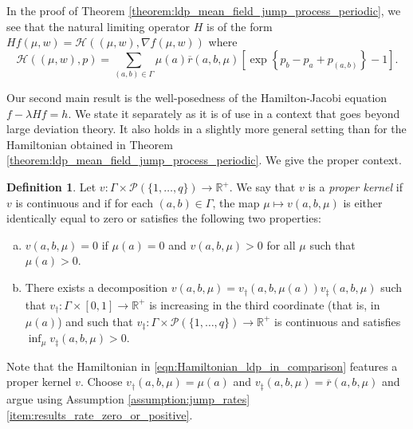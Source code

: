 \documentclass[a4paper]{article}
\newcommand{\cH}{\mathcal{H}}
\newcommand{\cP}{\mathcal{P}}
\newcommand{\bR}{\mathbb{R}}
\numberwithin{equation}{section}
\theoremstyle{definition}
\newtheorem{definition}[theorem]{Definition}
\begin{document}
\smallskip

In the proof of Theorem \ref{theorem:ldp_mean_field_jump_process_periodic}, we see that the natural limiting operator $H$ is  of the form $Hf(\mu,w) = \cH((\mu,w), \nabla f(\mu,w))$ where 
\begin{equation} \label{eqn:Hamiltonian_ldp_in_comparison}
	\cH((\mu,w),p) = \sum_{(a,b) \in \Gamma} \mu(a) \overline{r}(a,b,\mu)\left[\exp\left\{p_b - p _a + p_{(a,b)} \right\} - 1 \right].
\end{equation}


\smallskip

Our second main result is the well-posedness of the Hamilton-Jacobi equation $f - \lambda Hf = h$. We state it separately as it is of use in a context that goes beyond large deviation theory. It also holds in a slightly more general setting than for the Hamiltonian obtained in Theorem \ref{theorem:ldp_mean_field_jump_process_periodic}. We give the proper context.



\begin{definition} \label{definition:limiting_kernel}
	Let $v : \Gamma \times \cP(\{1,\dots,q\}) \rightarrow \bR^+$. We say that $v$ is a \textit{proper kernel} if $v$ is continuous and if for each $(a,b) \in \Gamma$, the map $\mu \mapsto v(a,b,\mu)$ is either identically equal to zero or satisfies the following two properties:
	\begin{enumerate}[(a)]
		\item $v(a,b,\mu) = 0$ if $\mu(a) = 0$ and $v(a,b,\mu) > 0$ for all $\mu$ such that $\mu(a) > 0$. 
		\item There exists a decomposition $v(a,b,\mu) = v_{\dagger}(a,b,\mu(a)) v_{\ddagger}(a,b,\mu)$ such that $v_{\dagger} : \Gamma \times [0,1] \rightarrow \bR^+$ is increasing in the third coordinate (that is, in $\mu(a)$) and such that $v_{\ddagger} : \Gamma \times \cP(\{1,\dots,q\}) \rightarrow \bR^+$ is continuous and satisfies $\inf_{\mu} v_{\ddagger}(a,b,\mu) > 0$.
	\end{enumerate}
\end{definition}



Note that the Hamiltonian in \eqref{eqn:Hamiltonian_ldp_in_comparison} features a proper kernel $v$. Choose $v_\dagger(a,b,\mu) = \mu(a)$ and $v_\ddagger(a,b,\mu) = \overline{r}(a,b,\mu)$ and argue using Assumption \ref{assumption:jump_rates} \ref{item:results_rate_zero_or_positive}.
\end{document}
